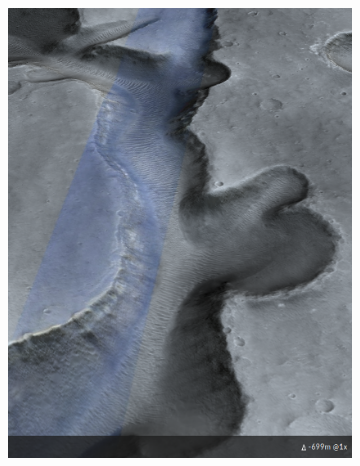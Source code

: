\begin{figure}[h]
\captionsetup[subfigure]{justification=centering}
	\centering
    \setlength{\subfigureWidth}{0.50\textwidth}
    \setlength{\graphicsHeight}{90mm}
    \hypersetup{hidelinks=true}%
    \begin{subfigure}[t]{\subfigureWidth}
        \centering
        \includegraphics[height=\graphicsHeight]{sections/mars-solar-energy/mission-sites/images/western-iani-chaos-dtm.png}
        \label{fig:sub:western-iani-chaos-dtm}
    \end{subfigure}\hfill
    \begin{subfigure}[t]{\subfigureWidth}
        \centering

\end{subfigure}
\end{figure}
